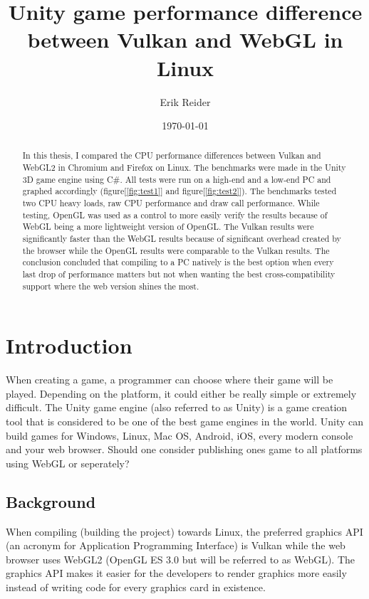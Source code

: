 \documentclass{article}
\title{Unity game performance difference between Vulkan and WebGL in Linux}
\author{Erik Reider}
\date{\today}
\begin{document}
\maketitle
\newpage

\begin{abstract}
In this thesis, I compared the CPU performance differences between Vulkan and WebGL2 in Chromium and Firefox on Linux. The benchmarks were made in the Unity 3D game engine using C\#. All tests were run on a high-end and a low-end PC and graphed accordingly (figure[\ref{fig:test1}] and figure[\ref{fig:test2}]). The benchmarks tested two CPU heavy loads, raw CPU performance and draw call performance. While testing, OpenGL was used as a control to more easily verify the results because of WebGL being a more lightweight version of OpenGL. The Vulkan results were significantly faster than the WebGL results because of significant overhead created by the browser while the OpenGL results were comparable to the Vulkan results. The conclusion concluded that compiling to a PC natively is the best option when every last drop of performance matters but not when wanting the best cross-compatibility support where the web version shines the most.
\end{abstract}

\newpage


\tableofcontents
\listoffigures
\newpage


\section {Introduction}
When creating a game, a programmer can choose where their game will be played. Depending on the platform, it could either be really simple or extremely difficult. The Unity game engine (also referred to as Unity) is a game creation tool that is considered to be one of the best game engines in the world. Unity can build games for Windows, Linux, Mac OS, Android, iOS, every modern console and your web browser. Should one consider publishing ones game to all platforms using WebGL or seperately?

\subsection {Background}

When compiling (building the project) towards Linux, the preferred graphics API (an acronym for Application Programming Interface) is Vulkan while the web browser uses WebGL2 (OpenGL ES 3.0 but will be referred to as WebGL). The graphics API makes it easier for the developers to render graphics more easily instead of writing code for every graphics card in existence\cite{APIWiki}.
\end{document}
